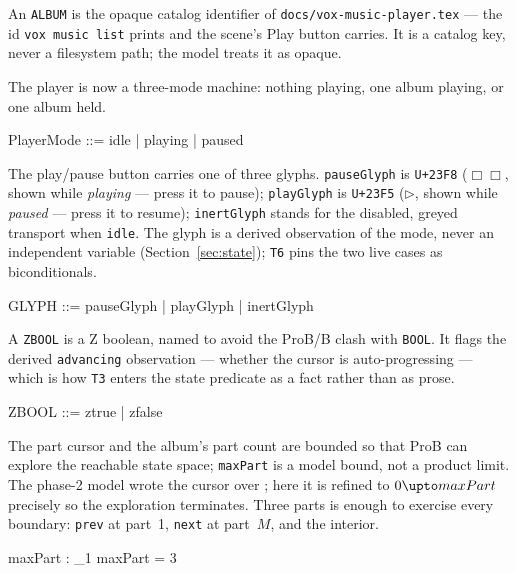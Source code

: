 \documentclass[a4paper,10pt,fleqn]{article}
\begin{document}
An \texttt{ALBUM} is the opaque catalog identifier of
\texttt{docs/vox-music-player.tex} --- the id \texttt{vox music list} prints and
the scene's Play button carries. It is a catalog key, never a filesystem path;
the model treats it as opaque.

\begin{zed}
  [ALBUM]
\end{zed}

The player is now a three-mode machine: nothing playing, one album playing, or
one album held.

\begin{zed}
  PlayerMode ::= idle | playing | paused
\end{zed}

The play/pause button carries one of three glyphs. \texttt{pauseGlyph} is
\texttt{U+23F8} ($\Box\Box$, shown while \emph{playing} --- press it to pause);
\texttt{playGlyph} is \texttt{U+23F5} ($\triangleright$, shown while
\emph{paused} --- press it to resume); \texttt{inertGlyph} stands for the
disabled, greyed transport when \texttt{idle}. The glyph is a derived
observation of the mode, never an independent variable
(Section~\ref{sec:state}); \texttt{T6} pins the two live cases as
biconditionals.

\begin{zed}
  GLYPH ::= pauseGlyph | playGlyph | inertGlyph
\end{zed}

A \texttt{ZBOOL} is a Z boolean, named to avoid the ProB/B clash with
\texttt{BOOL}. It flags the derived \texttt{advancing} observation --- whether the
cursor is auto-progressing --- which is how \texttt{T3} enters the state
predicate as a fact rather than as prose.

\begin{zed}
  ZBOOL ::= ztrue | zfalse
\end{zed}

The part cursor and the album's part count are bounded so that ProB can explore
the reachable state space; \texttt{maxPart} is a model bound, not a product
limit. The phase-2 model wrote the cursor over \texttt{\nat}; here it is refined
to $0 \upto maxPart$ precisely so the exploration terminates. Three parts is
enough to exercise every boundary: \texttt{prev} at part~1, \texttt{next} at
part~$M$, and the interior.

\begin{axdef}
  maxPart : \nat_1
  \where
  maxPart = 3
\end{axdef}
\end{document}
